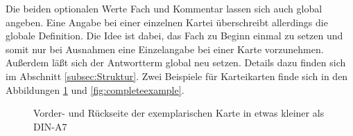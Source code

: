 \documentclass[a4paper,DIV=calc]{scrartcl}
\begin{document}
Die beiden optionalen Werte Fach und Kommentar lassen sich auch global angeben. Eine Angabe bei einer einzelnen Kartei überschreibt allerdings die globale Definition. Die Idee ist dabei, das Fach zu Beginn einmal zu setzen und somit nur bei Ausnahmen eine Einzelangabe bei einer Karte vorzunehmen. Außerdem läßt sich der Antwortterm global neu setzen. Details dazu finden sich im Abschnitt \ref{subsec:Struktur}. Zwei Beispiele für Karteikarten finde sich in den Abbildungen \ref{fig:example} und \ref{fig:completeexample}.
\begin{figure}
	\quad	{}
	\caption{Vorder- und Rückseite der exemplarischen Karte in etwas kleiner als DIN-A7}\label{fig:example}
\end{figure}
\end{document}
